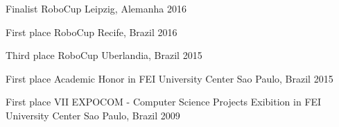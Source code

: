 



\begin{cvhonors}

  \cvhonor
    {Finalist} %
    {RoboCup \@Home} %
    {Leipzig, Alemanha} %
    {2016} %

\end{cvhonors}




\begin{cvhonors}

  \cvhonor
    {First place} %
    {RoboCup \@Home} %
    {Recife, Brazil} %
    {2016} %

  \cvhonor
    {Third place} %
    {RoboCup \@Home} %
    {Uberlandia, Brazil} %
    {2015} %

  \cvhonor
    {First place} %
    {Academic Honor in FEI University Center} %
    {Sao Paulo, Brazil} %
    {2015} %

  \cvhonor
    {First place} %
    {VII EXPOCOM - Computer Science Projects Exibition in FEI University Center} %
    {Sao Paulo, Brazil} %
    {2009} %

\end{cvhonors}
